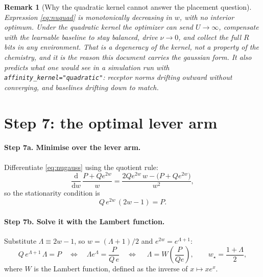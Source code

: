 \documentclass[11pt,a4paper]{article}
\newtheorem{remark}{Remark}
\begin{document}
\begin{remark}[Why the quadratic kernel cannot answer the placement question]
Expression \eqref{eq:nuquad} is \emph{monotonically decreasing} in $w$, with no interior
optimum. Under the quadratic kernel the optimizer can send $U\to\infty$, compensate with
the learnable baseline to stay balanced, drive $\nu\to0$, and collect the full $R$ bits
in any environment. That is a degeneracy of the kernel, not a property of the chemistry,
and it is the reason this document carries the gaussian form. It also predicts what one
would see in a simulation run with \texttt{affinity\_kernel="quadratic"}: receptor norms
drifting outward without converging, and baselines drifting down to match.
\end{remark}

\section{Step 7: the optimal lever arm}
\label{sec:lever}

\paragraph{Step 7a. Minimise over the lever arm.} Differentiate \eqref{eq:nugauss} using
the quotient rule:
\begin{equation}
  \frac{\mathrm{d}}{\mathrm{d}w}\,\frac{P+Qe^{2w}}{w}
   = \frac{2Qe^{2w}\,w-\big(P+Qe^{2w}\big)}{w^2},
\end{equation}
so the stationarity condition is
\begin{equation}
  Q\,e^{2w}\,(2w-1) = P .
  \label{eq:stationary}
\end{equation}

\paragraph{Step 7b. Solve it with the Lambert function.} Substitute
$\Lambda \equiv 2w-1$, so $w=(\Lambda+1)/2$ and $e^{2w}=e^{\Lambda+1}$:
\begin{equation}
  Q\,e^{\Lambda+1}\,\Lambda = P
  \quad\Longleftrightarrow\quad
  \Lambda e^{\Lambda} = \frac{P}{Q\,e}
  \quad\Longleftrightarrow\quad
  \boxed{\;\Lambda = W\!\left(\frac{P}{Qe}\right), \qquad w_\star=\frac{1+\Lambda}{2}, }
  \label{eq:lambertsol}
\end{equation}
where $W$ is the Lambert function, defined as the inverse of $x\mapsto xe^x$.
\end{document}
